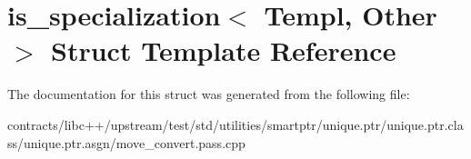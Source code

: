 \hypertarget{structis__specialization}{}\section{is\+\_\+specialization$<$ Templ, Other $>$ Struct Template Reference}
\label{structis__specialization}


The documentation for this struct was generated from the following file\+:\begin{DoxyCompactItemize}
\item 
contracts/libc++/upstream/test/std/utilities/smartptr/unique.\+ptr/unique.\+ptr.\+class/unique.\+ptr.\+asgn/move\+\_\+convert.\+pass.\+cpp\end{DoxyCompactItemize}
